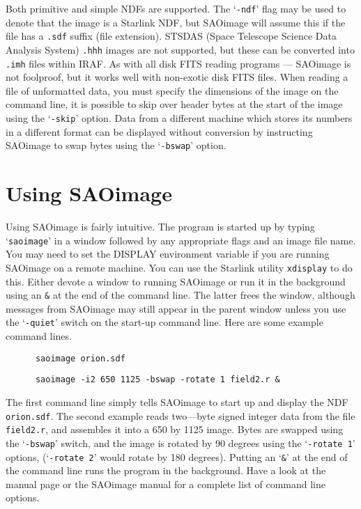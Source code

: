 Both primitive and simple NDFs are supported. The `{\tt -ndf}' flag may
be used to denote that the image is a Starlink NDF, but SAOimage will
assume this if the file has a {\tt .sdf} suffix (file extension).
STSDAS (Space Telescope Science Data Analysis System) {\tt .hhh} images
are not supported, but these can be converted into {\tt .imh} files
within IRAF. As with all disk FITS reading programs --- SAOimage is not
foolproof, but it works well with non-exotic disk FITS files. When reading a
file of unformatted data, you must specify the dimensions of the image
on the command line, it is possible to skip over header bytes at the
start of the image using the `{\tt -skip}' option. Data from a different
machine which stores its numbers in a different format can be
displayed without conversion by instructing SAOimage to swap bytes
using the `{\tt -bswap}' option.

\section{Using SAOimage}

Using SAOimage is fairly intuitive. The program is started up by
typing `{\tt saoimage}' in a window followed by any appropriate flags
and an image file name. You may need to set the DISPLAY environment
variable if you are running SAOimage on a remote machine. You can use
the Starlink utility {\tt xdisplay} to do this. Either devote a window
to running SAOimage or run it in the background using an {\tt \&} at
the end of the command line. The latter frees the window, although
messages from SAOimage may still appear in the parent window unless
you use the `{\tt -quiet}' switch on the start-up command line. Here
are some example command lines.

\begin{verbatim}
      saoimage orion.sdf
\end{verbatim}

\begin{verbatim}
      saoimage -i2 650 1125 -bswap -rotate 1 field2.r &
\end{verbatim}

The first command line simply tells SAOimage to start up and display
the NDF {\tt orion.sdf}. The second example reads two---byte signed
integer data from the file {\tt field2.r}, and assembles it into a 650
by 1125 image. Bytes are swapped using the `{\tt -bswap}' switch, and
the image is rotated by 90 degrees using the `{\tt -rotate 1}'
options, (`{\tt -rotate 2}' would rotate by 180 degrees). Putting an
`{\tt \&}' at the end of the command line runs the program in the
background. Have a look at the manual page or the SAOimage manual for
a complete list of command line options.

